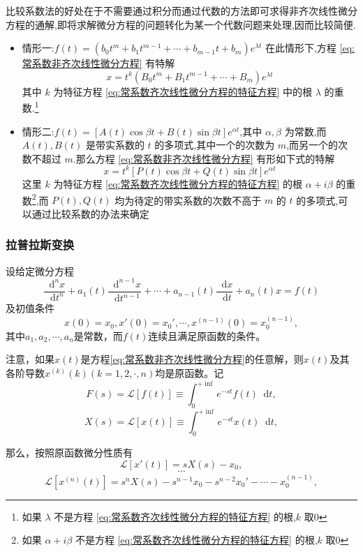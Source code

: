 \documentclass{ctexart}
\newcommand*{\dif}{\mathop{}\!\mathrm{d}}
\numberwithin{equation}{subsection}
\begin{document}
比较系数法的好处在于不需要通过积分而通过代数的方法即可求得非齐次线性微分方程的通解,即将求解微分方程的问题转化为某一个代数问题来处理,因而比较简便.
\begin{itemize}
        \item 情形一:$f(t)=(b_0t^m+b_1t^{m-1}+\cdots+b_{m-1}t+b_m)e^{\lambda t}$
在此情形下,方程 \eqref{eq:常系数非齐次线性微分方程} 有特解 
                \[x=t^k(B_0t^m+B_1t^{m-1}+\cdots+B_m)e^{\lambda t}\]
其中 $k$ 为特征方程 \eqref{eq:常系数齐次线性微分方程的特征方程} 中的根 $\lambda$ 的重数.\footnote{如果 $\lambda$ 不是方程 \eqref{eq:常系数齐次线性微分方程的特征方程} 的根,$k$ 取0}

        \item 情形二:$f(t)=[A(t)\cos\beta t+B(t)\sin\beta t]e^{\alpha t}$,其中 $\alpha,\beta$ 为常数,而 $A(t),B(t)$ 是带实系数的 $t$ 的多项式,其中一个的次数为 $m$,而另一个的次数不超过 $m$.那么方程 \eqref{eq:常系数非齐次线性微分方程} 有形如下式的特解
        \[x=t^k[P(t)\cos\beta t+Q(t)\sin\beta t]e^{\alpha t}\]
        这里 $k$ 为特征方程 \eqref{eq:常系数齐次线性微分方程的特征方程} 的根 $\alpha+i\beta$ 的重数\footnote{如果 $\alpha+i\beta$ 不是方程 \eqref{eq:常系数齐次线性微分方程的特征方程} 的根,$k$ 取0},而 $P(t),Q(t)$ 均为待定的带实系数的次数不高于 $m$ 的 $t$ 的多项式,可以通过比较系数的办法来确定
\end{itemize}

\subsubsection{\textcolor[rgb]{1,0,0}{拉普拉斯变换}}
设给定微分方程\[\frac{\dif^nx}{\dif t^n}+a_1(t)\frac{\dif^{n-1}x}{\dif t^{n-1}}+\cdots+a_{n-1}(t)\frac{\dif x}{\dif t}+a_n(t)x=f(t) \]
及初值条件\[ x(0)=x_0,{x}'(0)={x_0}',\cdots,x^{(n-1)}(0)=x_0^{(n-1)},  \]其中$a_1,a_2,\cdots,a_n$是常数，而$f(t)$连续且满足原函数的条件。

注意，如果$x(t)$是方程\eqref{eq:常系数非齐次线性微分方程}的任意解，则$x(t)$及其各阶导数$x^{(k)}(k)(k=1,2,\cdot,n)$均是原函数。记\[ 
        F(s)=\mathcal{L}[f(t)] \equiv \int_0^{+\inf} e^{-st} f(t) \dif t ,
        \]
        \[ 
                X(s)=\mathcal{L}[x(t)] \equiv \int_0^{+\inf} e^{-st} x(t) \dif t ,
                \]

那么，按照原函数微分性质有\[\mathcal{L}[{x}'(t)]=sX(s)-x_0,\] \[ \cdots \] 
\[ \mathcal{L}[x^{(n)}(t)]=s^nX(s)-s^{n-1}x_0-s^{n-2}{x_0}'-\cdots-x_0^{(n-1)} ,\]
\end{document}
